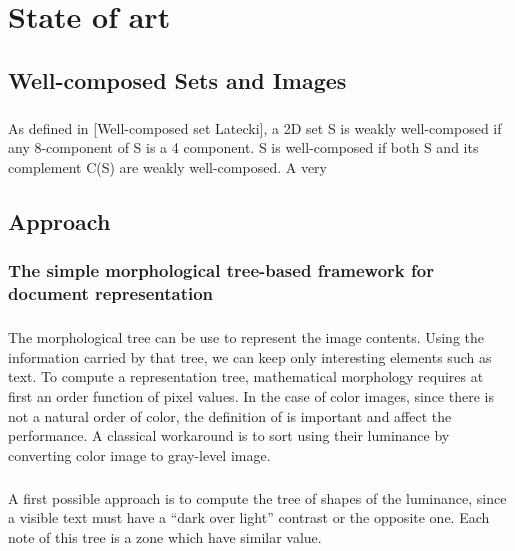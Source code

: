 \documentclass[12pt,a4paper]{report}
\author{HUYNH Le Duy}
\begin{document}
\tableofcontents

\chapter{State of art}
\section{Well-composed Sets and Images}
\paragraph{}
As defined in [Well-composed set Latecki], a 2D set S is weakly well-composed if any 8-component of S is a 4 component. S is well-composed if both S and its complement C(S) are weakly well-composed. A very 


\section{Approach}
\subsection{The simple morphological tree-based framework for document representation}
\paragraph{}
The morphological tree can be use to represent the image contents. Using the information carried by that tree, we can keep only interesting elements such as text. To compute a representation tree, mathematical morphology requires at first an order function of pixel values. In the case of color images, since there is not a natural order of color, the definition of is important and affect the performance. A classical workaround is to sort using their luminance by converting color image to gray-level image. 
\paragraph{}
A first possible approach is to compute the tree of shapes of the luminance, since a visible text must have a “dark over light” contrast or the opposite one. Each note of this tree is a zone which have similar value.
\end{document}
